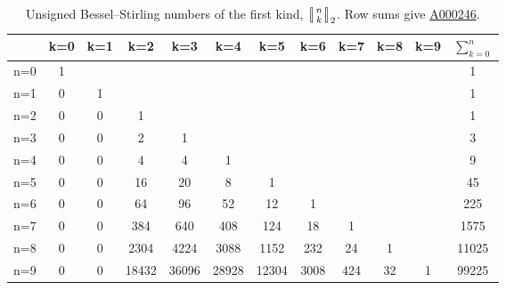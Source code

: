 \documentclass[a4paper]{amsart}
\numberwithin{equation}{section}
\newcommand{\mStirlingone}[2]{\left[\mkern-3.8mu\middle|\genfrac{}{}{0pt}{}{#1}{#2}\middle|\mkern-3.8mu\right]}
\begin{document}
\begin{table}[htbp]
    \centering
    \begin{tabular}{|l|*{10}{c}|c|}
        \hline
          & k=0 & k=1 & k=2   & k=3   & k=4   & k=5   & k=6   & k=7   & k=8   & k=9   & $\sum_{k=0}^{n}$ \\
        \hline
        n=0 & 1   &     &       &       &       &       &       &       &       &       & 1                  \\
        n=1 & 0   & 1   &       &       &       &       &       &       &       &       & 1                  \\
        n=2 & 0   & 0   & 1     &       &       &       &       &       &       &       & 1                  \\
        n=3 & 0   & 0   & 2     & 1     &       &       &       &       &       &       & 3                  \\
        n=4 & 0   & 0   & 4     & 4     & 1     &       &       &       &       &       & 9                  \\
        n=5 & 0   & 0   & 16    & 20    & 8     & 1     &       &       &       &       & 45                 \\
        n=6 & 0   & 0   & 64    & 96    & 52    & 12    & 1     &       &       &       & 225                \\
        n=7 & 0   & 0   & 384   & 640   & 408   & 124   & 18    & 1     &       &       & 1575               \\
        n=8 & 0   & 0   & 2304  & 4224  & 3088  & 1152  & 232   & 24    & 1     &       & 11025              \\
        n=9 & 0   & 0   & 18432 & 36096 & 28928 & 12304 & 3008  & 424   & 32    & 1     & 99225              \\
        \hline
    \end{tabular}
    \bigskip
    \caption{Unsigned Bessel--Stirling numbers of the first kind, $\mStirlingone{n}{k}_2$. Row sums give \href{https://oeis.org/A000246}{A000246}.}
    \label{tab-bessel-stirling1}
\end{table}
\end{document}
